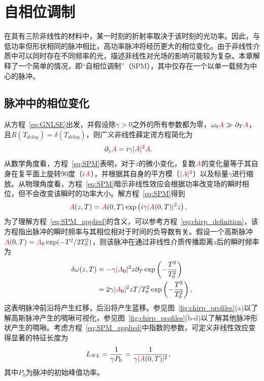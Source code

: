 \chapter{自相位调制}
\label{ch:SPM}

在具有三阶非线性的材料中，某一时刻的折射率取决于该时刻的光功率。因此，与低功率但形状相同的脉冲相比，高功率脉冲将经历更大的相位变化。由于非线性介质中可以同时存在不同频率的光，描述非线性对光场的影响可能较为复杂。本章解释了一个简单的情况，即“自相位调制”（SPM），其中仅存在一个以单一载频为中心的脉冲。

\section{脉冲中的相位变化}
从方程~\ref{eq:GNLSE}出发，并假设除$\gamma>0$之外的所有参数都为零，$\omega_0\textcolor{red}{A}\gg\partial_T\textcolor{red}{A}$，且$R(T_{delay})=\delta(T_{delay})$，则广义非线性薛定谔方程简化为
\begin{align}
\label{eq:SPM}
    \partial_z\textcolor{red}{A} &= i\gamma|\textcolor{red}{A}|^2\textcolor{red}{A}.
\end{align}
从数学角度看，方程~\ref{eq:SPM}表明，对于$z$的微小变化，复数$\textcolor{red}{A}$的变化量等于其自身在复平面上旋转90度（$i\textcolor{red}{A}$），并根据其自身的平方模（$|\textcolor{red}{A}|^2$）以及标量$\gamma$进行缩放。从物理角度看，方程~\ref{eq:SPM}暗示非线性效应会根据功率改变场的瞬时相位，但不会改变该瞬时的功率大小。解方程~\ref{eq:SPM}得到
\begin{align}
    \label{eq:SPM_applied}
    \textcolor{red}{A}(z,T)&= \textcolor{red}{A}(0,T)\exp\left( i\gamma|\textcolor{red}{A}(0,T)|^2z \right).
\end{align}
为了理解方程~\ref{eq:SPM_applied}的含义，可以参考方程~\ref{eq:chirp_definition}，该方程指出脉冲的瞬时频率与其相位相对于时间的负导数有关。假设一个高斯脉冲$\textcolor{red}{A}(0,T)=\textcolor{red}{A}_0\exp(-T^2/2T_0^2)$，则该脉冲在通过非线性介质传播距离$z$后的瞬时频率为
\begin{align}
\label{eq:SPM_example}
    \delta\omega(z,T) &= -\gamma |\textcolor{red}{A}_0|^2 z\partial_T \exp\left(-\frac{T^2}{T_0^2}\right)\\ \nonumber
    &= 2\gamma |\textcolor{red}{A}_0|^2 z T/T_0^2 \exp\left(-\frac{T^2}{T_0^2}\right),
\end{align}
这表明脉冲前沿将产生红移，后沿将产生蓝移。参见图~\ref{fig:chirp_profiles}(a)以了解高斯脉冲产生的啁啾可视化，参见图~\ref{fig:chirp_profiles}(b-d)以了解其他脉冲形状产生的啁啾。考虑方程~\ref{eq:SPM_applied}中指数的参数，可定义非线性效应变得显著的特征长度为
\begin{align}
    L_{NL} &= \frac{1}{\gamma P_0} = \frac{1}{\gamma |\textcolor{red}{A}(0,T)|^2},  
\end{align}
其中$P_0$为脉冲的初始峰值功率。

